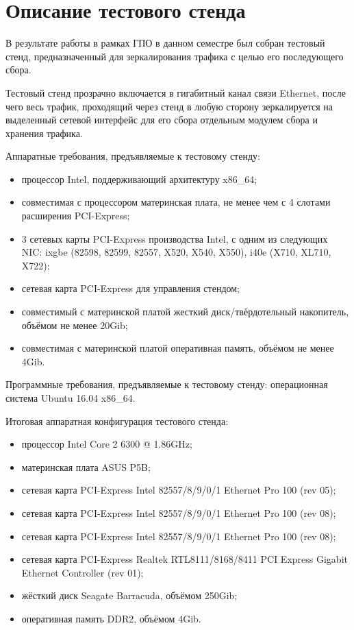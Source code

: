 \section{Описание тестового стенда}

В результате работы в рамках ГПО в данном семестре был собран тестовый стенд, предназначенный для зеркалирования трафика с целью его последующего сбора.\par 

Тестовый стенд прозрачно включается в гигабитный канал связи Ethernet, после чего весь трафик, проходящий через стенд в любую сторону зеркалируется на выделенный сетевой интерфейс для его сбора отдельным модулем сбора и хранения трафика.\par 
 
Аппаратные требования, предъявляемые к тестовому стенду:
\begin{itemize}
	\item процессор Intel, поддерживающий архитектуру x86\_64;
	\item совместимая с процессором материнская плата, не менее чем с 4 слотами расширения PCI-Express;
	\item 3 сетевых карты PCI-Express производства Intel, с одним из следующих NIC: ixgbe (82598, 82599, 82557, X520, X540, X550), i40e (X710, XL710, X722);
	\item  сетевая карта PCI-Express для управления стендом;
	\item совместимый с материнской платой жесткий диск/твёрдотельный накопитель, объёмом не менее 20Gib;
	\item совместимая с материнской платой оперативная память, объёмом не менее 4Gib.
\end{itemize}

Программные требования, предъявляемые к тестовому стенду: операционная система Ubuntu 16.04 x86\_64.\par 

Итоговая аппаратная конфигурация тестового стенда:
\begin{itemize}
\item процессор Intel Core 2 6300 @ 1.86GHz;
\item материнская плата ASUS P5B;
\item сетевая карта PCI-Express Intel 82557/8/9/0/1 Ethernet Pro 100 (rev 05);
\item сетевая карта PCI-Express Intel 82557/8/9/0/1 Ethernet Pro 100 (rev 08);
\item сетевая карта PCI-Express Intel 82557/8/9/0/1 Ethernet Pro 100 (rev 08);
\item сетевая карта PCI-Express Realtek RTL8111/8168/8411 PCI Express Gigabit Ethernet Controller (rev 01);
\item жёсткий диск Seagate Barracuda, объёмом 250Gib;
\item оперативная память DDR2, объёмом 4Gib.
\end{itemize}

